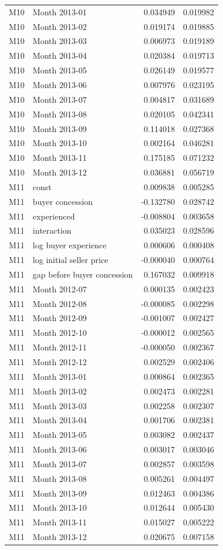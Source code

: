 \documentclass[11pt,a4paper]{article}
\begin{document}
\begin{longtable}{lp{8.4cm}rr}
M10 & Month 2013-01 & 0.034949 & 0.019982 \\
M10 & Month 2013-02 & 0.019174 & 0.019885 \\
M10 & Month 2013-03 & 0.006973 & 0.019189 \\
M10 & Month 2013-04 & 0.020384 & 0.019713 \\
M10 & Month 2013-05 & 0.026149 & 0.019577 \\
M10 & Month 2013-06 & 0.007976 & 0.023195 \\
M10 & Month 2013-07 & 0.004817 & 0.031689 \\
M10 & Month 2013-08 & 0.020105 & 0.042341 \\
M10 & Month 2013-09 & 0.114018 & 0.027368 \\
M10 & Month 2013-10 & 0.002164 & 0.046281 \\
M10 & Month 2013-11 & 0.175185 & 0.071232 \\
M10 & Month 2013-12 & 0.036881 & 0.056719 \\
M11 & const & 0.009838 & 0.005285 \\
M11 & buyer concession & -0.132780 & 0.028742 \\
M11 & experienced & -0.008804 & 0.003658 \\
M11 & interaction & 0.035023 & 0.028596 \\
M11 & log buyer experience & 0.000606 & 0.000408 \\
M11 & log initial seller price & -0.000040 & 0.000764 \\
M11 & gap before buyer concession & 0.167032 & 0.009918 \\
M11 & Month 2012-07 & 0.000135 & 0.002423 \\
M11 & Month 2012-08 & -0.000085 & 0.002298 \\
M11 & Month 2012-09 & -0.001007 & 0.002427 \\
M11 & Month 2012-10 & -0.000012 & 0.002565 \\
M11 & Month 2012-11 & -0.000050 & 0.002367 \\
M11 & Month 2012-12 & 0.002529 & 0.002406 \\
M11 & Month 2013-01 & 0.000864 & 0.002365 \\
M11 & Month 2013-02 & 0.002473 & 0.002281 \\
M11 & Month 2013-03 & 0.002258 & 0.002307 \\
M11 & Month 2013-04 & 0.001706 & 0.002381 \\
M11 & Month 2013-05 & 0.003082 & 0.002437 \\
M11 & Month 2013-06 & 0.003017 & 0.003046 \\
M11 & Month 2013-07 & 0.002857 & 0.003598 \\
M11 & Month 2013-08 & 0.005261 & 0.004497 \\
M11 & Month 2013-09 & 0.012463 & 0.004386 \\
M11 & Month 2013-10 & 0.012644 & 0.005430 \\
M11 & Month 2013-11 & 0.015027 & 0.005222 \\
M11 & Month 2013-12 & 0.020675 & 0.007158 \\
\end{longtable}
\normalsize
\end{document}
